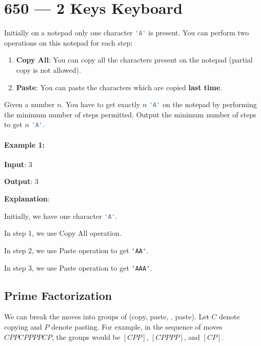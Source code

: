 \section{650 --- 2 Keys Keyboard}
Initially on a notepad only one character \lstinline[language=Java, basicstyle=\small\ttfamily, keywordstyle=\bfseries\color{green!40!black}]|'A'| is present. You can perform two operations on this notepad for each step:

\begin{enumerate}
\item \textbf{Copy All}: You can copy all the characters present on the notepad (partial copy is not allowed).
\item \textbf{Paste}: You can paste the characters which are copied \textbf{last time}.

\end{enumerate}
 
Given a number $n$. You have to get exactly $n$ \lstinline[language=Java, basicstyle=\small\ttfamily, keywordstyle=\bfseries\color{green!40!black}]|'A'| on the notepad by performing the minimum number of steps permitted. Output the minimum number of steps to get $n$ \lstinline[language=Java, basicstyle=\small\ttfamily, keywordstyle=\bfseries\color{green!40!black}]|'A'|.

\paragraph{Example 1:}

\begin{flushleft}
\textbf{Input}: 3

\textbf{Output}: 3

\textbf{Explanation}:

Initially, we have one character \lstinline[language=Java, basicstyle=\small\ttfamily, keywordstyle=\bfseries\color{green!40!black}]|'A'|.

In step 1, we use Copy All operation.

In step 2, we use Paste operation to get \lstinline[language=Java, basicstyle=\small\ttfamily, keywordstyle=\bfseries\color{green!40!black}]|'AA'|.

In step 3, we use Paste operation to get \lstinline[language=Java, basicstyle=\small\ttfamily, keywordstyle=\bfseries\color{green!40!black}]|'AAA'|.

\end{flushleft}

\subsection{Prime Factorization}
We can break the moves into groups of (copy, paste, \textellipsis, paste). Let $C$ denote copying and $P$ denote pasting. For example, in the sequence of moves $CPPCPPPPCP$, the groups would be $[CPP]$, $[CPPPP]$, and $[CP]$.

